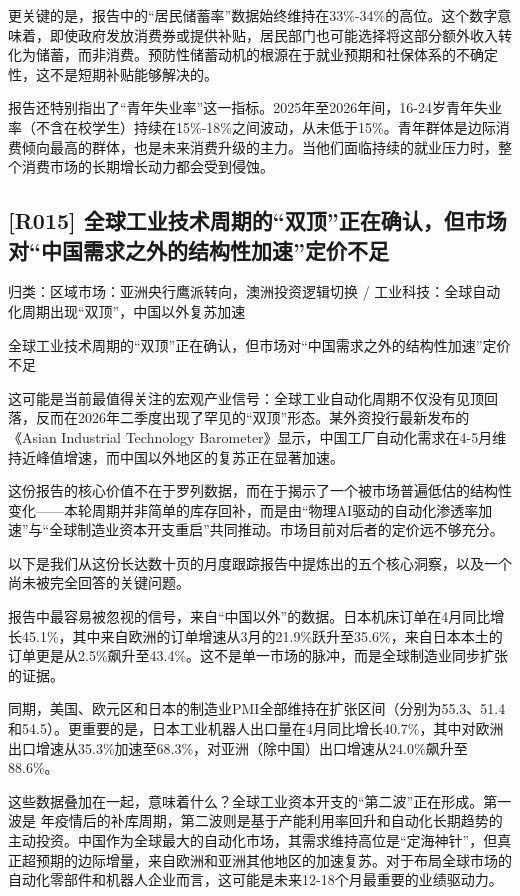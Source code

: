\documentclass[11pt]{ctexart}
\begin{document}
更关键的是，报告中的“居民储蓄率”数据始终维持在33\%-34\%的高位。这个数字意味着，即使政府发放消费券或提供补贴，居民部门也可能选择将这部分额外收入转化为储蓄，而非消费。预防性储蓄动机的根源在于就业预期和社保体系的不确定性，这不是短期补贴能够解决的。

报告还特别指出了“青年失业率”这一指标。2025年至2026年间，16-24岁青年失业率（不含在校学生）持续在15\%-18\%之间波动，从未低于15\%。青年群体是边际消费倾向最高的群体，也是未来消费升级的主力。当他们面临持续的就业压力时，整个消费市场的长期增长动力都会受到侵蚀。

\subsection{[R015] 全球工业技术周期的“双顶”正在确认，但市场对“中国需求之外的结构性加速”定价不足}
{\small\color{refgray}归类：区域市场：亚洲央行鹰派转向，澳洲投资逻辑切换 / 工业科技：全球自动化周期出现“双顶”，中国以外复苏加速}

全球工业技术周期的“双顶”正在确认，但市场对“中国需求之外的结构性加速”定价不足

这可能是当前最值得关注的宏观产业信号：全球工业自动化周期不仅没有见顶回落，反而在2026年二季度出现了罕见的“双顶”形态。某外资投行最新发布的《Asian Industrial Technology Barometer》显示，中国工厂自动化需求在4-5月维持近峰值增速，而中国以外地区的复苏正在显著加速。

这份报告的核心价值不在于罗列数据，而在于揭示了一个被市场普遍低估的结构性变化——本轮周期并非简单的库存回补，而是由“物理AI驱动的自动化渗透率加速”与“全球制造业资本开支重启”共同推动。市场目前对后者的定价远不够充分。

以下是我们从这份长达数十页的月度跟踪报告中提炼出的五个核心洞察，以及一个尚未被完全回答的关键问题。

报告中最容易被忽视的信号，来自“中国以外”的数据。日本机床订单在4月同比增长45.1\%，其中来自欧洲的订单增速从3月的21.9\%跃升至35.6\%，来自日本本土的订单更是从2.5\%飙升至43.4\%。这不是单一市场的脉冲，而是全球制造业同步扩张的证据。

同期，美国、欧元区和日本的制造业PMI全部维持在扩张区间（分别为55.3、51.4和54.5）。更重要的是，日本工业机器人出口量在4月同比增长40.7\%，其中对欧洲出口增速从35.3\%加速至68.3\%，对亚洲（除中国）出口增速从24.0\%飙升至88.6\%。

这些数据叠加在一起，意味着什么？全球工业资本开支的“第二波”正在形成。第一波是 年疫情后的补库周期，第二波则是基于产能利用率回升和自动化长期趋势的主动投资。中国作为全球最大的自动化市场，其需求维持高位是“定海神针”，但真正超预期的边际增量，来自欧洲和亚洲其他地区的加速复苏。对于布局全球市场的自动化零部件和机器人企业而言，这可能是未来12-18个月最重要的业绩驱动力。
\end{document}
